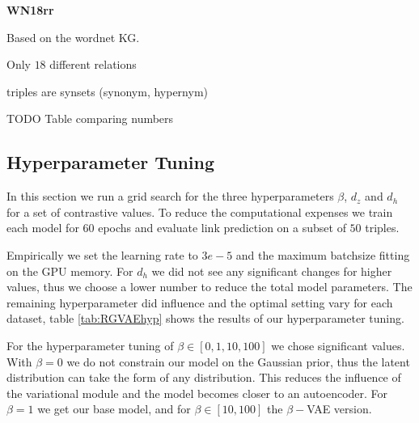 \textbf{WN18rr}

Based on the wordnet KG.

Only $18$ different relations

triples are synsets (synonym, hypernym)

TODO Table comparing numbers

\subsection{Hyperparameter Tuning}

In this section we run a grid search for the three hyperparameters $\beta$, $d_z$ and $d_h$ for a set of contrastive values. To reduce the computational expenses we train each model for $60$ epochs and  evaluate link prediction on a subset of $50$ triples.

Empirically we set the learning rate to $3e-5$ and the maximum batchsize fitting on the GPU memory. For $d_h$ we did not see any significant changes for higher values, thus we choose a lower number to reduce the total model parameters. The remaining hyperparameter did influence and the optimal setting vary for each dataset, table \ref{tab:RGVAEhyp} shows the results of our hyperparameter tuning.


For the hyperparameter tuning of $\beta \in [0,1,10,100]$ we chose significant values. With $\beta = 0$ we do not constrain our model on the Gaussian prior, thus the latent distribution can take the form of any distribution. This reduces the influence of the variational module and the model becomes closer to an autoencoder. For $\beta = 1$ we get our base model, and for $\beta \in [10,100]$ the $\beta-$VAE version.


